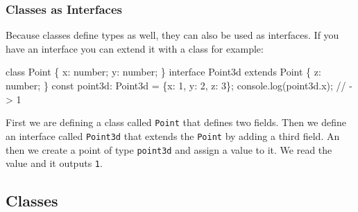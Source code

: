\documentclass[12pt,]{article}
\newenvironment{Shaded}{}{}
\newcommand{\KeywordTok}[1]{\textcolor[rgb]{0.00,0.00,1.00}{{#1}}}
\newcommand{\DataTypeTok}[1]{{#1}}
\newcommand{\DecValTok}[1]{{#1}}
\newcommand{\CommentTok}[1]{\textcolor[rgb]{0.00,0.50,0.00}{{#1}}}
\newcommand{\FunctionTok}[1]{{#1}}
\newcommand{\NormalTok}[1]{{#1}}
\begin{document}
\subsubsection{Classes as Interfaces}\label{classes-as-interfaces}

Because classes define types as well, they can also be used as
interfaces. If you have an interface you can extend it with a class for
example:

\begin{Shaded}
\begin{Highlighting}[numbers=left,,]
\KeywordTok{class} \NormalTok{Point \{}
  \NormalTok{x: number;}
  \NormalTok{y: number;}
\NormalTok{\}}
\KeywordTok{interface} \NormalTok{Point3d }\KeywordTok{extends} \NormalTok{Point \{}
  \NormalTok{z: number;}
\NormalTok{\}}
\DataTypeTok{const} \NormalTok{point3d: Point3d = \{x: }\DecValTok{1}\NormalTok{, y: }\DecValTok{2}\NormalTok{, z: }\DecValTok{3}\NormalTok{\};}
\NormalTok{console.}\FunctionTok{log}\NormalTok{(point3d.}\FunctionTok{x}\NormalTok{); }\CommentTok{// -> 1}
\end{Highlighting}
\end{Shaded}

First we are defining a class called \texttt{Point} that defines two
fields. Then we define an interface called \texttt{Point3d} that extends
the \texttt{Point} by adding a third field. An then we create a point of
type \texttt{point3d} and assign a value to it. We read the value and it
outputs \texttt{1}.

\subsection{Classes}\label{classes}
\end{document}
